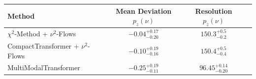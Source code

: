     \begin{tabular}{lccc}
        \toprule
        Method & Mean Deviation $p_{z}(\nu)$ & Resolution $p_{z}(\nu)$ \\
        \midrule
        $\chi^2$-Method + $\nu^2$-Flows & $-0.04^{+0.17}_{-0.20}$ & $150.3^{+0.5}_{-0.2}$ \\
        CompactTransformer + $\nu^2$-Flows & $-0.10^{+0.19}_{-0.16}$ & $150.4^{+0.5}_{-0.4}$ \\
        MultiModalTransformer & $-0.25^{+0.19}_{-0.11}$ & $96.45^{+0.14}_{-0.20}$ \\
        \bottomrule
    \end{tabular}